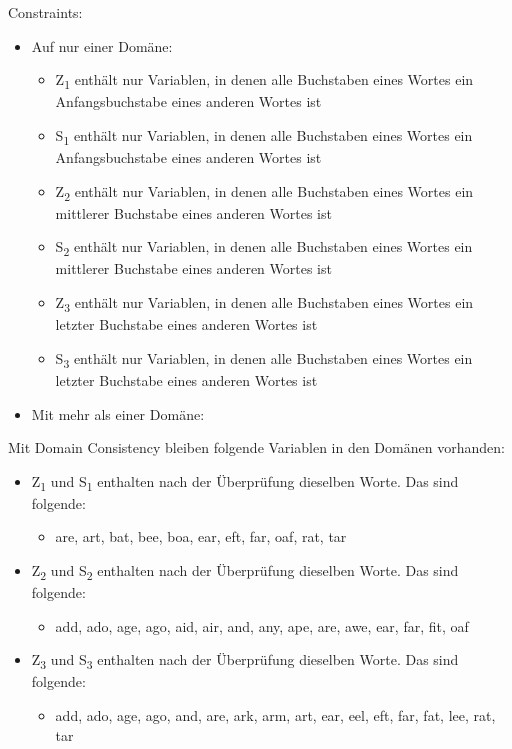 \documentclass[ngerman]{fbi-aufgabenblatt}
\begin{document}
Constraints: 
\begin{itemize}
	\item Auf nur einer Domäne: 
	\begin{itemize}
	\item Z\textsubscript{1} enthält nur Variablen, in denen alle Buchstaben eines Wortes ein Anfangsbuchstabe eines anderen Wortes ist 
	\item S\textsubscript{1} enthält nur Variablen, in denen alle Buchstaben eines  Wortes ein Anfangsbuchstabe eines anderen Wortes ist  
	\item Z\textsubscript{2} enthält nur Variablen, in denen alle Buchstaben eines Wortes ein mittlerer Buchstabe eines anderen Wortes ist 
	\item S\textsubscript{2} enthält nur Variablen, in denen alle Buchstaben eines Wortes ein mittlerer Buchstabe eines anderen Wortes ist
	\item Z\textsubscript{3} enthält nur Variablen, in denen alle Buchstaben eines Wortes ein letzter Buchstabe eines anderen Wortes ist 
	\item S\textsubscript{3} enthält nur Variablen, in denen alle Buchstaben eines Wortes ein letzter Buchstabe eines anderen Wortes ist 
	\end{itemize}
	\item Mit mehr als einer Domäne: 
\end{itemize}

Mit Domain Consistency bleiben folgende Variablen in den Domänen vorhanden:
\begin{itemize}
	\item Z\textsubscript{1} und S\textsubscript{1} enthalten nach der Überprüfung dieselben Worte. Das sind folgende:
	\begin{itemize}
		\item are, art, bat, bee, boa, ear, eft, far, oaf, rat, tar
	\end{itemize}
	\item Z\textsubscript{2} und S\textsubscript{2} enthalten nach der Überprüfung dieselben Worte. Das sind folgende:
	\begin{itemize}
		\item add, ado, age, ago, aid, air, and, any, ape, are, awe, ear, far, fit, oaf
	\end{itemize}
	\item Z\textsubscript{3} und S\textsubscript{3} enthalten nach der Überprüfung dieselben Worte. Das sind folgende:
	\begin{itemize}
		\item add, ado, age, ago, and, are, ark, arm, art, ear, eel, eft, far, fat, lee, rat, tar
	\end{itemize}
\end{itemize}

		
\end{document}
